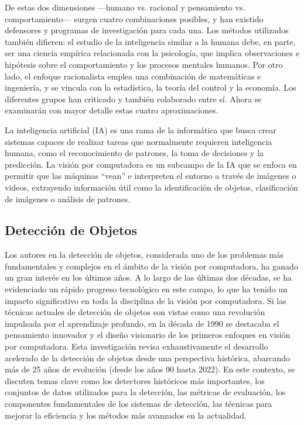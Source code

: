 De estas dos dimensiones —humano vs. racional y pensamiento vs. comportamiento— surgen cuatro combinaciones posibles, y han existido defensores y programas de investigación para cada una. Los métodos utilizados también difieren: el estudio de la inteligencia similar a la humana debe, en parte, ser una ciencia empírica relacionada con la psicología, que implica observaciones e hipótesis sobre el comportamiento y los procesos mentales humanos. Por otro lado, el enfoque racionalista emplea una combinación de matemáticas e ingeniería, y se vincula con la estadística, la teoría del control y la economía. Los diferentes grupos han criticado y también colaborado entre sí. Ahora se examinarán con mayor detalle estas cuatro aproximaciones.

La inteligencia artificial (IA) es una rama de la informática que busca crear sistemas capaces de realizar tareas que normalmente requieren inteligencia humana, como el reconocimiento de patrones, la toma de decisiones y la predicción. La visión por computadora es un subcampo de la IA que se enfoca en permitir que las máquinas “vean” e interpreten el entorno a través de imágenes o videos, extrayendo información útil como la identificación de objetos, clasificación de imágenes o análisis de patrones.

\subsection{Detección de Objetos}

Los autores en \cite{zou2023object} la detección de objetos, considerada uno de los problemas más fundamentales y complejos en el ámbito de la visión por computadora, ha ganado un gran interés en los últimos años. A lo largo de las últimas dos décadas, se ha evidenciado un rápido progreso tecnológico en este campo, lo que ha tenido un impacto significativo en toda la disciplina de la visión por computadora. Si las técnicas actuales de detección de objetos son vistas como una revolución impulsada por el aprendizaje profundo, en la década de 1990 se destacaba el pensamiento innovador y el diseño visionario de los primeros enfoques en visión por computadora. Esta investigación revisa exhaustivamente el desarrollo acelerado de la detección de objetos desde una perspectiva histórica, abarcando más de 25 años de evolución (desde los años 90 hasta 2022). En este contexto, se discuten temas clave como los detectores históricos más importantes, los conjuntos de datos utilizados para la detección, las métricas de evaluación, los componentes fundamentales de los sistemas de detección, las técnicas para mejorar la eficiencia y los métodos más avanzados en la actualidad.

